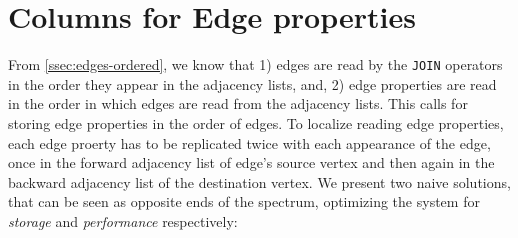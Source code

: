 \section{Columns for Edge properties}
\label{sec:edge-property-columns}

From \ref{ssec:edges-ordered}, we know that 1) edges are read by the \texttt{JOIN} operators in the order they appear in the adjacency lists, and, 2) edge properties are read in the order in which edges are read from the adjacency lists. This calls for storing edge properties in the order of edges. To localize reading edge properties, each edge proerty has to be replicated twice with each appearance of the edge, once in the forward adjacency list of edge's source vertex and then again in the backward adjacency list of the destination vertex. We present two naive solutions, that can be seen as opposite ends of the spectrum, optimizing the system for \emph{storage} and \emph{performance} respectively:

